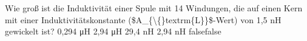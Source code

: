     {Wie groß ist die Induktivität einer Spule mit 14 Windungen, die auf einen Kern mit einer Induktivitätskonstante (\$A\_\{\textbackslash\{\}textrm\{L\}\}\$-Wert) von 1,5 nH gewickelt ist?}
    {0,294 μH}
    {2,94 μH}
    {29,4 nH}
    {2,94 nH}
    {false}{false}
